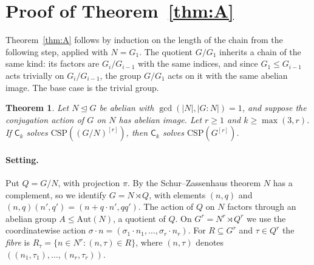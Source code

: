 \documentclass[11pt]{article}
\newtheorem{theorem}{Theorem}[section]
\theoremstyle{definition}
\theoremstyle{remark}
\newcommand{\Csp}{\mathrm{CSP}}
\newcommand{\Coh}{\mathsf{C}}
\begin{document}
\section{Proof of Theorem~\ref{thm:A}}\label{sec:A}

Theorem~\ref{thm:A} follows by induction on the length of the chain from the
following step, applied with $N=G_1$. The quotient $G/G_1$ inherits a chain of
the same kind: its factors are $G_i/G_{i-1}$ with the same indices, and since
$G_1\le G_{i-1}$ acts trivially on $G_i/G_{i-1}$, the group $G/G_1$ acts on it
with the same abelian image. The base case is the trivial group.

\begin{theorem}\label{thm:step}
Let $N\unlhd G$ be abelian with $\gcd(|N|,|G:N|)=1$, and suppose the conjugation
action of $G$ on $N$ has abelian image. Let $r\ge1$ and $k\ge\max(3,r)$. If
$\Coh_k$ solves $\Csp((G/N)^{[r]})$, then $\Coh_k$ solves $\Csp(G^{[r]})$.
\end{theorem}

\paragraph{Setting.} Put $Q=G/N$, with projection $\pi$. By the
Schur--Zassenhaus theorem $N$ has a complement, so we identify $G=N\rtimes Q$,
with elements $(n,q)$ and $(n,q)(n',q')=(n+q\cdot n',qq')$. The action of $Q$
on $N$ factors through an abelian group $A\le\mathrm{Aut}(N)$, a quotient of $Q$.
On $G^r=N^r\rtimes Q^r$ we use the coordinatewise action
$\sigma\cdot n=(\sigma_1\cdot n_1,\dots,\sigma_r\cdot n_r)$. For $R\subseteq G^r$
and $\tau\in Q^r$ the \emph{fibre} is $R_\tau=\{n\in N^r:(n,\tau)\in R\}$, where
$(n,\tau)$ denotes $((n_1,\tau_1),\dots,(n_r,\tau_r))$.
\end{document}
